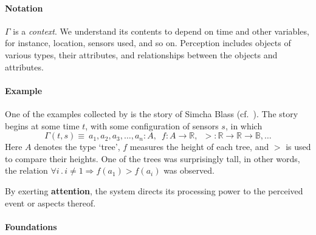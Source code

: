 \paragraph{\textbf{\upshape Notation}}

$\Gamma$ is a \emph{context}.  We understand its contents to depend on
time and other variables, for instance, location, sensors used, and so
on.  Perception includes objects of various types, their attributes,
and relationships between the objects and attributes.

\paragraph{\textbf{\upshape Example}}

One of the examples collected by \citet{van1994anatomy} is the story
of Simcha Blass (cf.~\cite{shoji1977drip}).
The story begins at some time $t$, with some configuration of sensors
$s$, in which
$$\Gamma(t,s) \equiv\: a_1, a_2, a_3, \ldots, a_n : A,\enspace
f:A\rightarrow \mathbb{R},\enspace
>:\mathbb{R}\rightarrow\mathbb{R}\rightarrow \mathbb{B}, \ldots$$
Here $A$ denotes the type `tree', $f$ measures the height of each
tree, and $>$ is used to compare their heights.  One of the trees was
surprisingly tall, in other words, the relation $\forall i \mathbin{.}
i\neq 1 \Rightarrow f(a_1)>f(a_i)$ was observed.

\begin{center}
\asterism
\end{center}

\begin{defn}\label{def:attention}
\hypertarget{def:attention}{}By exerting \textbf{attention}, the system directs its processing power to the perceived event or aspects thereof.
\end{defn}

\paragraph{\textbf{\upshape Foundations}}

